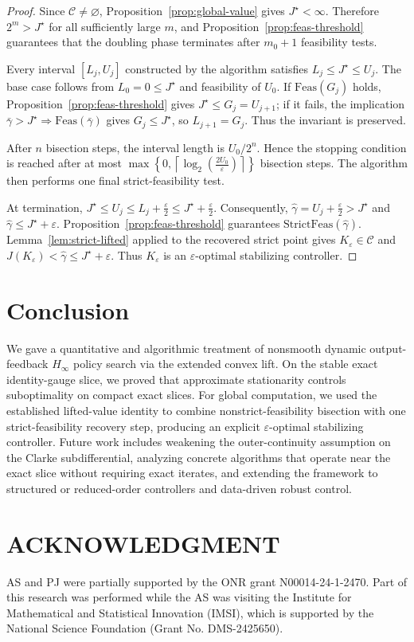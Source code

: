 \documentclass[letterpaper,10pt,conference]{ieeeconf}
\providecommand{\cC}{\mathcal{C}}
\renewcommand{\^}[1]{^{(#1)}}
\begin{document}
\begin{proof}
Since $\cC\neq\varnothing$, Proposition~\ref{prop:global-value}
gives $J^\star<\infty$. Therefore $2^m>J^\star$ for all
sufficiently large $m$, and Proposition~\ref{prop:feas-threshold}
guarantees that the doubling phase terminates after $m_0+1$
feasibility tests.

Every interval $[L_j,U_j]$ constructed by the algorithm satisfies
$L_j\le J^\star\le U_j$. The base case follows from
$L_0=0\le J^\star$ and feasibility of $U_0$. If
$\mathrm{Feas}(G_j)$ holds, Proposition~\ref{prop:feas-threshold}
gives $J^\star\le G_j=U_{j+1}$; if it fails, the implication
$\bar\gamma>J^\star\Rightarrow\mathrm{Feas}(\bar\gamma)$ gives
$G_j\le J^\star$, so $L_{j+1}=G_j$. Thus the invariant is
preserved.

After $n$ bisection steps, the interval length is $U_0/2^n$.
Hence the stopping condition is reached after at most
$
\max\left\{
0,
\left\lceil
\log_2\!\left(\frac{2U_0}{\varepsilon}\right)
\right\rceil
\right\}
$
bisection steps. The algorithm then performs one final
strict-feasibility test.

At termination,
$
J^\star\le U_j\le L_j+\frac{\varepsilon}{2}
\le J^\star+\frac{\varepsilon}{2}.
$
Consequently,
$\widehat\gamma=U_j+\frac{\varepsilon}{2}>J^\star$ and
$\widehat\gamma\le J^\star+\varepsilon$.
Proposition~\ref{prop:feas-threshold} guarantees
$\mathrm{StrictFeas}(\widehat\gamma)$. Lemma~\ref{lem:strict-lifted}
applied to the recovered strict point gives $K_\varepsilon\in\cC$
and
$
J(K_\varepsilon)<\widehat\gamma\le J^\star+\varepsilon.
$
Thus $K_\varepsilon$ is an $\varepsilon$-optimal stabilizing
controller.
\end{proof}

\section{Conclusion}
We gave a quantitative and algorithmic treatment of nonsmooth dynamic output-feedback $H_\infty$ policy search via the extended convex lift. On the stable exact identity-gauge slice, we proved that approximate stationarity controls suboptimality on compact exact slices. For global computation, we used the established lifted-value identity to combine nonstrict-feasibility bisection with one strict-feasibility recovery step, producing an explicit $\varepsilon$-optimal stabilizing controller. Future work includes weakening the outer-continuity assumption on the Clarke subdifferential, analyzing concrete algorithms that operate near the exact slice without requiring exact iterates, and extending the framework to structured or reduced-order controllers and data-driven robust control.

\section*{ACKNOWLEDGMENT}
AS and PJ were partially supported by the ONR grant N00014-24-1-2470. Part of this research was performed while the AS was visiting the Institute for Mathematical and Statistical Innovation (IMSI), which is supported by the National Science Foundation (Grant No. DMS-2425650).





\end{document}
